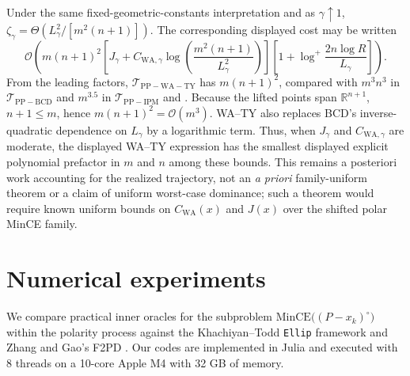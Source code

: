 \documentclass[smallextended]{svjour3}
\newcommand{\R}{\mathbb{R}}
\begin{document}
Under the same fixed-geometric-constants interpretation and as $\gamma\uparrow1$,
$\zeta_\gamma=\Theta(L_\gamma^2/[m^2(n+1)])$. The corresponding displayed
cost may be written
\[
    \mathcal O\!\left(
      m(n+1)^2\left[
      J_\gamma+C_{\mathrm{WA},\gamma}\log\!\left(
      \frac{m^2(n+1)}{L_\gamma^2}\right)\right]
      \left[1+\log^+\!\frac{2n\log R}{L_\gamma}\right]
    \right).
\]
From the leading factors, $\mathcal T_{\mathrm{PP-WA-TY}}$ has
$m(n+1)^2$, compared with $m^3n^3$ in $\mathcal T_{\mathrm{PP-BCD}}$ and
$m^{3.5}$ in $\mathcal T_{\mathrm{PP-IPM}}$ and \cite{anstreicher2002improved,khachiyan1990complexity}.
Because the lifted points span $\R^{n+1}$, $n+1\leq m$, hence
$m(n+1)^2=\mathcal O(m^3)$. WA--TY also replaces BCD's inverse-quadratic
dependence on $L_\gamma$ by a logarithmic term. Thus, when $J_\gamma$ and
$C_{\mathrm{WA},\gamma}$ are moderate, the displayed WA--TY expression has the
smallest displayed explicit polynomial prefactor in $m$ and $n$ among these bounds.
This remains a posteriori work accounting for the realized trajectory, not an \emph{a
priori} family-uniform theorem or a claim of uniform worst-case dominance;
such a theorem would require known uniform bounds on $C_{\mathrm{WA}}(x)$ and
$J(x)$ over the shifted polar MinCE family.


\section{Numerical experiments}\label{sec:numerical-experiments}
We compare practical inner oracles for the subproblem $\mathrm{MinCE}\bigl((P-x_k)^\circ\bigr)$
within the polarity process against the Khachiyan--Todd \texttt{Ellip}
framework \cite{khachiyan1990complexity} and Zhang and Gao's F2PD 
\cite{zhanggao2003mvie}. Our codes are implemented in Julia \cite{bezanson2017julia}
and executed with 8 threads on a 10-core Apple M4
with 32 GB of memory.
\end{document}
